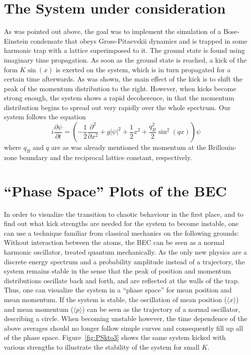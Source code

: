 \section{The System under consideration}
As was pointed out above, the goal was to implement the simulation of a Bose-Einstein condensate
that obeys Gross-Pitaevskii dynamics and is trapped in some harmonic trap with a lattice superimposed to it.
The ground state is found using imaginary time propagation. As soon as the ground state is reached, a kick
of the form $K\sin(x)$ is exerted on the system, which is in turn propagated for a certain time afterwards. 
As was shown, the main effect of the kick is to shift the peak of the momentum distribution to the right.
However, when kicks become strong enough, the system shows a rapid decoherence, in that the momentum
distribution begins to spread out very rapidly over the whole spectrum.
Our system follows the equation
	\begin{equation}\label{eq:oursys}
		i\frac{\partial\psi}{\partial t}=\left(-\frac{1}{2}\frac{\partial^2}{\partial x^2}+g|\psi|^2+\frac{1}{2}x^2
		+\frac{q_B^2}{2}\sin^2(qx)\right)\psi
	\end{equation}
where $q_B$ and $q$ are as was already mentioned the momentum at the Brillouin-zone boundary and the
reciprocal lattice constant, respectively. 

\section{``Phase Space'' Plots of the BEC}
In order to visualize the transition to chaotic behaviour in the first place, and to find out what kick strengths are needed for the system to become instable, one can use a technique familiar from classical mechanics on the following grounds: Without interaction between the atoms, the BEC can be seen as a normal harmonic oscillator, treated quantum mechanically. As the only new physics are a discrete energy spectrum and a probability amplitude instead of a trajectory, the system remains stable in the sense that the peak of position and momentum distributions oscillate back and forth, and are reflected at the walls of the trap. Thus, one can visualize the system in a ``phase space'' for mean position and mean momentum. If the system is stable, the oscillation of mean position ($\langle x\rangle$) and mean momentum ($\langle p \rangle$) can be seen as the trajectory of a normal oscillator, describing a circle. When becoming unstable however, the time dependence of the above averages should no longer follow simple curves and consequently fill up all of the phase space.  Figure~\ref{fig:PSkto3} shows the same system kicked with various strengths to illustrate the stability of the system for small $K$. 

